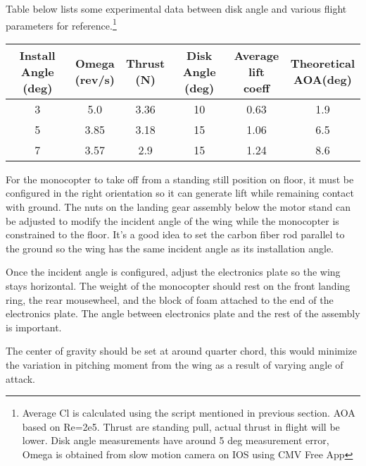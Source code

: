 \documentclass[12pt]{article}
\begin{document}
Table below lists some experimental data between disk angle and various flight parameters for reference.\footnote{Average Cl is calculated using the script mentioned in previous section. AOA based on Re=2e5. Thrust are standing pull, actual thrust in flight will be lower. Disk angle measurements have around 5 deg measurement error, Omega is obtained from slow motion camera on IOS using CMV Free App}

\begin{table}[]
  \begin{tabular}{|c|c|c|c|c|c|}
    \hline 
    \makecell{Install Angle \\ (deg)} & \makecell{Omega \\ (rev/s)} & \makecell{Thrust \\ (N)} & \makecell{Disk Angle \\ (deg)} & \makecell{Average \\ lift coeff} & \makecell{Theoretical \\ AOA(deg)} \\\hline
    3                  & 5.0           & 3.36      & 10              & 0.63         & 1.9                  \\\hline
    5                  & 3.85          & 3.18      & 15              & 1.06         & 6.5                  \\\hline
    7                  & 3.57          & 2.9       & 15              & 1.24         & 8.6                 \\\hline
  \end{tabular}
\end{table}

For the monocopter to take off from a standing still position on floor, it must be configured in the right orientation so it can generate lift while remaining contact with ground. 
The nuts on the landing gear assembly below the motor stand can be adjusted to modify the incident angle of the wing while the monocopter is constrained to the floor. It's a good idea to set the carbon fiber rod parallel to the ground so the wing has the same incident angle as its installation angle.

Once the incident angle is configured, adjust the electronics plate so the wing stays horizontal. The weight of the monocopter should rest on the front landing ring, the rear mousewheel, and the block of foam attached to the end of the electronics plate. The angle between electronics plate and the rest of the assembly is important. 

The center of gravity should be set at around quarter chord, this would minimize the variation in pitching moment from the wing as a result of varying angle of attack.
\end{document}
